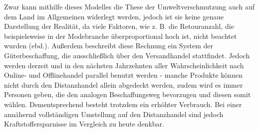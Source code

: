 \begin{folding}
\begin{itemize}
\end{itemize}
Zwar kann mithilfe dieses Modelles die These der Umweltverschmutzung auch auf dem Land im Allgemeinen widerlegt werden, jedoch ist sie keine genaue Darstellung der Realität, da viele Faktoren, wie z. B. die Retouranzahl, die beispielsweise in der Modebranche überproportional hoch ist, nicht beachtet wurden (ebd.). Außerdem beschreibt diese Rechnung ein System der Güterbeschaffung, die ausschließlich über den Versandhandel stattfindet. Jedoch werden derzeit und in den nächsten Jahrzehnten aller Wahrscheinlichkeit nach Online- und Offlinehandel parallel benutzt werden - manche Produkte können nicht durch den Distanzhandel allein abgedeckt werden, zudem wird es immer Personen geben, die den analogen Beschaffungsweg bevorzugen und diesen somit wählen. Dementsprechend besteht trotzdem ein erhöhter Verbrauch. Bei einer annähernd vollständigen Umstellung auf den Distanzhandel  sind jedoch Kraftstoffersparnisse im Vergleich zu heute denkbar.

\end{folding}

